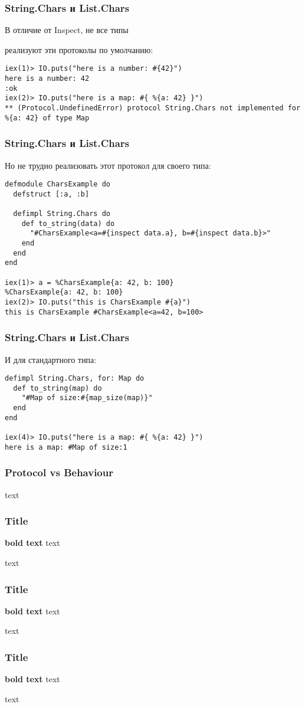 \documentclass[10pt]{beamer}
\begin{document}
\begin{frame}[fragile]
  \frametitle{String.Chars и List.Chars}
  В отличие от Inspect, не все типы
  \par \bigskip
  реализуют эти протоколы по умолчанию:
  \par \bigskip
  \begin{lstlisting}
iex(1)> IO.puts("here is a number: #{42}")
here is a number: 42
:ok
iex(2)> IO.puts("here is a map: #{ %{a: 42} }")
** (Protocol.UndefinedError) protocol String.Chars not implemented for %{a: 42} of type Map
  \end{lstlisting}
\end{frame}

\begin{frame}[fragile]
  \frametitle{String.Chars и List.Chars}
  Но не трудно реализовать этот протокол для своего типа:
  \par \bigskip
  \begin{lstlisting}
defmodule CharsExample do
  defstruct [:a, :b]

  defimpl String.Chars do
    def to_string(data) do
      "#CharsExample<a=#{inspect data.a}, b=#{inspect data.b}>"
    end
  end
end

iex(1)> a = %CharsExample{a: 42, b: 100}
%CharsExample{a: 42, b: 100}
iex(2)> IO.puts("this is CharsExample #{a}")
this is CharsExample #CharsExample<a=42, b=100>
  \end{lstlisting}
\end{frame}

\begin{frame}[fragile]
  \frametitle{String.Chars и List.Chars}
  И для стандартного типа:
  \par \bigskip
  \begin{lstlisting}
defimpl String.Chars, for: Map do
  def to_string(map) do
    "#Map of size:#{map_size(map)}"
  end
end

iex(4)> IO.puts("here is a map: #{ %{a: 42} }")
here is a map: #Map of size:1
  \end{lstlisting}
\end{frame}

\begin{frame}
  \frametitle{Protocol vs Behaviour}
  text
\end{frame}

\begin{frame}
  \frametitle{Title}
  \textbf{bold text} text
  \par \bigskip
  text
\end{frame}

\begin{frame}
  \frametitle{Title}
  \textbf{bold text} text
  \par \bigskip
  text
\end{frame}

\begin{frame}
  \frametitle{Title}
  \textbf{bold text} text
  \par \bigskip
  text
\end{frame}
\end{document}
